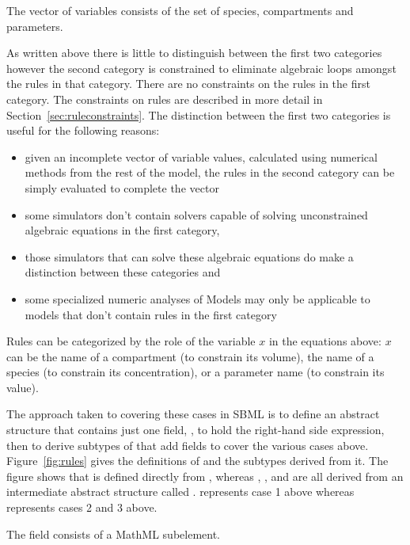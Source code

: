 \documentclass[10pt]{cekarticle}
\newcommand{\vref}[1]{\ref{#1}}
\begin{document}
The vector of variables consists of the set of species,
compartments and parameters.  

As written above there is little to distinguish between the first two categories however the second category is constrained to eliminate algebraic loops amongst the rules in that category. There are no constraints on the rules in the first category.  The constraints on rules are described in more detail in Section~\ref{sec:ruleconstraints}. The distinction between the first two categories is useful for the following reasons:
\begin{itemize}
\item given an incomplete vector of variable values, calculated using numerical methods from the rest of the model, the rules in the second category can be simply evaluated to complete the vector
\item some simulators don't contain solvers capable of solving unconstrained algebraic equations in the first category,
\item those simulators that can solve these algebraic equations do make
a distinction between these categories and
\item some specialized numeric analyses of Models may only be applicable to models that don't contain rules in the first category
\end{itemize}

Rules can be categorized by the role of the variable $x$ in the
equations above: $x$ can be the name of a compartment (to
constrain its volume), the name of a species (to constrain its
concentration), or a parameter name (to constrain its value).

The approach taken to covering these cases in SBML is to define an
abstract  structure that contains just one field,
, to hold the right-hand side expression, then to
derive subtypes of  that add fields to cover the
various cases above. Figure~\vref{fig:rules} gives the definitions
of  and the subtypes derived from it.  The figure
shows that  is defined directly from
, whereas ,
, and  are
all derived from an intermediate abstract structure called
.   represents case 1 above whereas  represents cases 2 and 3 above.

The  field consists of a MathML 
subelement.
\end{document}
